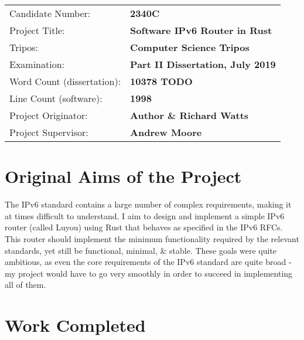 \documentclass[12pt,a4paper,twoside,openright]{report}
\begin{document}
{\large
\begin{tabular}{ll}
Candidate Number:          & \bf 2340C                      \\
Project Title:             & \bf Software IPv6 Router in Rust \\
Tripos:                    & \bf Computer Science Tripos  \\
Examination:               & \bf Part II Dissertation, July 2019  \\
Word Count (dissertation): & \bf 10378 TODO\footnotemark[1]  \\
Line Count (software):     & \bf 1998 \footnotemark[2] \\
Project Originator:        & \bf Author \& Richard Watts \\
Project Supervisor:        & \bf Andrew Moore \\
\end{tabular}
}






\section*{Original Aims of the Project}

The IPv6 standard\cite{ipv6_rfc} contains a large number of complex requirements, making it at times difficult to understand. I aim to design and implement a simple IPv6 router (called Luyou) using Rust\cite{rust} that behaves as specified in the IPv6 RFCs. This router should implement the minimum functionality required by the relevant standards, yet still be functional, minimal, \& stable.  These goals were quite ambitious, as even the core requirements of the IPv6 standard are quite broad - my project would have to go very smoothly in order to succeed in implementing all of them.

\section*{Work Completed}
\end{document}
